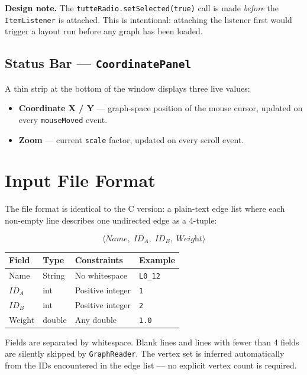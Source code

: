 \documentclass[12pt,a4paper]{article}
\begin{document}
\textbf{Design note.} The \texttt{tutteRadio.setSelected(true)} call is
made \emph{before} the \texttt{ItemListener} is attached. This is
intentional: attaching the listener first would trigger a layout run
before any graph has been loaded.

\subsection{Status Bar — \texttt{CoordinatePanel}}

A thin strip at the bottom of the window displays three live values:

\begin{itemize}
  \item \textbf{Coordinate X / Y} — graph-space position of the mouse cursor,
        updated on every \texttt{mouseMoved} event.
  \item \textbf{Zoom} — current \texttt{scale} factor, updated on every
        scroll event.
\end{itemize}

\section{Input File Format}

The file format is identical to the C version: a plain-text edge list where
each non-empty line describes one undirected edge as a 4-tuple:

\[
  \langle \textit{Name},\; \textit{ID}_A,\; \textit{ID}_B,\; \textit{Weight} \rangle
\]

\begin{center}
\begin{tabular}{llll}
\toprule
\textbf{Field}  & \textbf{Type}   & \textbf{Constraints} & \textbf{Example} \\
\midrule
Name     & String  & No whitespace          & \texttt{L0\_12} \\
$ID_A$   & int     & Positive integer       & \texttt{1} \\
$ID_B$   & int     & Positive integer       & \texttt{2} \\
Weight   & double  & Any double             & \texttt{1.0} \\
\bottomrule
\end{tabular}
\end{center}

Fields are separated by whitespace. Blank lines and lines with fewer than
4 fields are silently skipped by \texttt{GraphReader}. The vertex set is
inferred automatically from the IDs encountered in the edge list — no
explicit vertex count is required.
\end{document}
